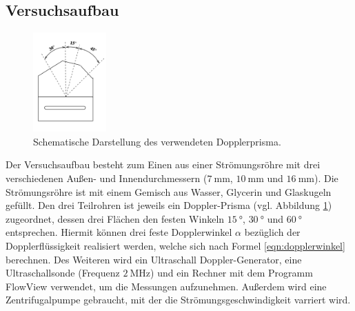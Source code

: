 \subsection{Versuchsaufbau}
\label{sec:Versuchsaufbau}
\begin{figure}
  \centering
  \includegraphics[width=0.25\textwidth]{Bilder/prisma.png}
  \caption{Schematische Darstellung des verwendeten Dopplerprisma. \cite{Anleitung}}
  \label{fig:dopplerprisma}
\end{figure}
Der Versuchsaufbau besteht zum Einen aus einer Strömungsröhre mit drei verschiedenen Außen- und 
Innendurchmessern ($\SI{7}{\milli\meter}$, $\SI{10}{\milli\meter}$ und $\SI{16}{\milli\meter}$).
Die Strömungsröhre ist mit einem Gemisch aus Wasser, Glycerin und Glaskugeln gefüllt.
Den drei Teilrohren ist jeweils ein Doppler-Prisma (vgl. Abbildung
\ref{fig:dopplerprisma}) zugeordnet, dessen drei Flächen den festen Winkeln $\SI{15}{\degree}$,
$\SI{30}{\degree}$ und $\SI{60}{\degree}$ entsprechen. Hiermit können drei feste Dopplerwinkel $\alpha$ bezüglich der Dopplerflüssigkeit realisiert werden, welche sich nach Formel \eqref{eqn:dopplerwinkel} berechnen.
Des Weiteren wird ein Ultraschall Doppler-Generator, eine Ultraschallsonde (Frequenz
$\SI{2}{\mega\hertz}$) und ein Rechner mit dem Programm FlowView verwendet, um die Messungen
aufzunehmen. Außerdem wird eine Zentrifugalpumpe gebraucht, mit der die
Strömungsgeschwindigkeit
varriert wird.
